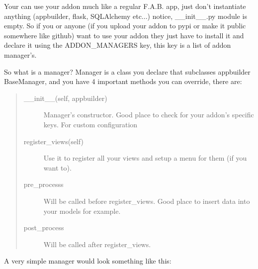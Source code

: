 \documentclass[letterpaper,10pt,english]{sphinxmanual}
\begin{document}
Your can use your addon much like a regular F.A.B. app, just don't instantiate anything (appbuilder, flask, SQLAlchemy etc...)
notice, \_\_init\_\_.py module is empty. So if you or anyone (if you upload your addon to pypi or make it public somewhere
like github) want to use your addon they just have to install it and declare it using the ADDON\_MANAGERS key, this
key is a list of addon manager's.

So what is a manager? Manager is a class you declare that subclasses appbuilder BaseManager, and you have 4 important
methods you can override, there are:
\begin{quote}\begin{description}
\item[{\_\_init\_\_(self, appbuilder)}] \leavevmode
Manager's constructor. Good place to check for your addon's specific keys. For custom configuration

\item[{register\_views(self)}] \leavevmode
Use it to register all your views and setup a menu for them (if you want to).

\item[{pre\_processs}] \leavevmode
Will be called before register\_views. Good place to insert data into your models for example.

\item[{post\_process}] \leavevmode
Will be called after register\_views.

\end{description}\end{quote}

A very simple manager would look something like this:
\end{document}

